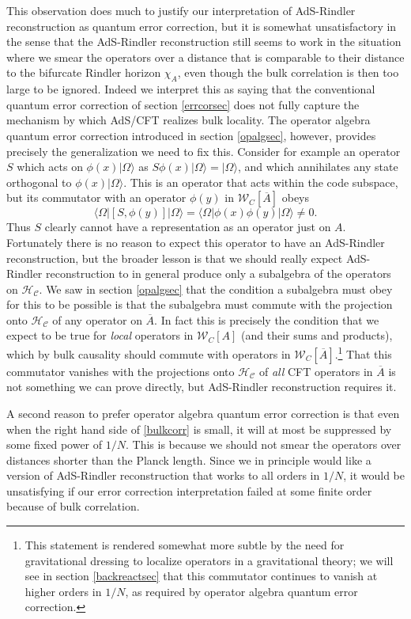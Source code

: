 \documentclass[11pt]{article}
\newcommand{\be}{\begin{equation}}
\newcommand{\ee}{\end{equation}}
\newcommand{\HC}{\mathcal{H}_{\mathcal{C}}}
\newcommand{\lan}{\langle}
\newcommand{\ran}{\rangle}
\newcommand{\W}{\mathcal{W}}
\newcommand{\ol}{\overline}
\begin{document}
This observation does much to justify our interpretation of AdS-Rindler reconstruction as quantum error correction, but it is somewhat unsatisfactory in the sense that the AdS-Rindler reconstruction still seems to work in the situation where we smear the operators over a distance that is comparable to their distance to the bifurcate Rindler horizon $\chi_A$, even though the bulk correlation is then too large to be ignored.  Indeed we interpret this as saying that the conventional quantum error correction of section \ref{errcorsec} does not fully capture the mechanism by which AdS/CFT realizes bulk locality.  The operator algebra quantum error correction introduced in section \ref{opalgsec}, however, provides precisely the generalization we need to fix this.  Consider for example an operator $S$ which acts on $\phi(x)|\Omega\ran$ as $S\phi(x)|\Omega\ran=|\Omega\ran$, and which annihilates any state orthogonal to $\phi(x)|\Omega\ran$.  This is an operator that acts within the code subspace, but its commutator with an operator $\phi(y)$ in $\W_C[\ol{A}]$ obeys
\be
\lan \Omega|[S,\phi(y)]|\Omega\ran=\lan \Omega |\phi(x)\phi(y)|\Omega\ran\neq 0.
\ee 
Thus $S$ clearly cannot have a representation as an operator just on $A$.  Fortunately there is no reason to expect this operator to have an AdS-Rindler reconstruction, but the broader lesson is that we should really expect AdS-Rindler reconstruction to in general produce only a subalgebra of the operators on $\HC$.  We saw in section \ref{opalgsec} that the condition a subalgebra must obey for this to be possible is that the subalgebra must commute with the projection onto $\HC$ of any operator on $\ol{A}$.  In fact this is precisely the condition that we expect to be true for \textit{local} operators in $\W_C[A]$ (and their sums and products), which by bulk causality should commute with operators in $\W_C[\ol{A}]$.\footnote{This statement is rendered somewhat more subtle by the need for gravitational dressing to localize operators in a gravitational theory; we will see in section \ref{backreactsec} that this commutator continues to vanish at higher orders in $1/N$, as required by operator algebra quantum error correction.}  That this commutator vanishes with the projections onto $\HC$ of \textit{all} CFT operators in $\ol{A}$ is not something we can prove directly, but AdS-Rindler reconstruction requires it.

A second reason to prefer operator algebra quantum error correction is that even when the right hand side of \eqref{bulkcorr} is small, it will at most be suppressed by some fixed power of $1/N$.  This is because we should not smear the operators over distances shorter than the Planck length.  Since we in principle would like a version of AdS-Rindler reconstruction that works to all orders in $1/N$, it would be unsatisfying if our error correction interpretation failed at some finite order because of bulk correlation.  
\end{document}
